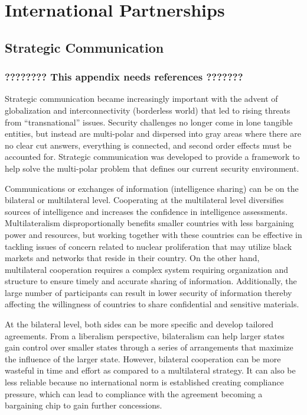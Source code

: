 \documentclass{report}
\begin{document}
\chapter[Appendix C: International Partnerships]{International Partnerships} \label{app:partners}

\section{Strategic Communication }

\subsection{????????  This appendix needs references  ???????}


Strategic communication became increasingly important with the advent of globalization and interconnectivity (borderless world) that led to rising threats from \enquote{transnational} issues. Security challenges no longer come in lone tangible entities, but instead are multi-polar and dispersed into gray areas where there are no clear cut answers, everything is connected, and second order effects must be accounted for. Strategic communication was developed to provide a framework to help solve the multi-polar problem that defines our current security environment.

Communications or exchanges of information (intelligence sharing) can be on the bilateral or multilateral level. Cooperating at the multilateral level diversifies sources of intelligence and increases the confidence in intelligence assessments. Multilateralism disproportionally benefits smaller countries with less bargaining power and resources, but working together with these countries can be effective in tackling issues of concern related to nuclear proliferation that may utilize black markets and networks that reside in their country. On the other hand, multilateral cooperation requires a complex system requiring organization and structure to ensure timely and accurate sharing of information. Additionally, the large number of participants can result in lower security of information thereby affecting the willingness of countries to share confidential and sensitive materials.

At the bilateral level, both sides can be more specific and develop tailored agreements. From a liberalism perspective, bilateralism can help larger states gain control over smaller states through a series of arrangements that maximize the influence of the larger state. However, bilateral cooperation can be more wasteful in time and effort as compared to a multilateral strategy. It can also be less reliable because no international norm is established creating compliance pressure, which can lead to compliance with the agreement becoming a bargaining chip to gain further concessions.
\end{document}
